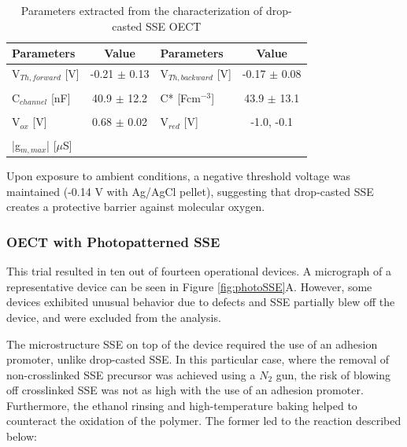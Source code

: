 \begin{table}[ht]
\centering
\caption{Parameters extracted from the characterization of drop-casted SSE OECT}
\begin{tabular}{l|c||l|c}
Parameters & Value & Parameters & Value \\\hline \hline
V$_{Th,forward}$ [V] & -0.21 $\pm$ 0.13 & V$_{Th,backward}$ [V] & -0.17 $\pm$ 0.08\\
& & &\\[-1em]
C$_{channel}$ [nF] & 40.9 $\pm$ 12.2 & C* [Fcm$^{-3}$] &  43.9 $\pm$ 13.1 \\
& & &\\[-1em]
V$_{ox}$ [V] & 0.68 $\pm$ 0.02 & V$_{red}$ [V] & -1.0, -0.1 \\
& & &\\[-1em]
|g$_{m,max}$| [$\mu$S] &  &  &\\\hline
\end{tabular}
\label{tab:dropfom}
\end{table}

Upon exposure to ambient conditions, a negative threshold voltage was maintained (-0.14 V with Ag/AgCl pellet), suggesting that drop-casted SSE creates a protective barrier against molecular oxygen.%

\subsubsection{OECT with Photopatterned SSE} %
This trial resulted in ten out of fourteen operational devices. A micrograph of a representative device can be seen in Figure \ref{fig:photoSSE}A. However, some devices exhibited unusual behavior due to defects and SSE partially blew off the device, and were excluded from the analysis.

The microstructure SSE on top of the device required the use of an adhesion promoter, unlike drop-casted SSE. In this particular case, where the removal of non-crosslinked SSE precursor was achieved using a $N_{2}$ gun, the risk of blowing off crosslinked SSE was not as high with the use of an adhesion promoter. Furthermore, the ethanol rinsing and high-temperature baking helped to counteract the oxidation of the polymer. The former led to the reaction described below: \\

